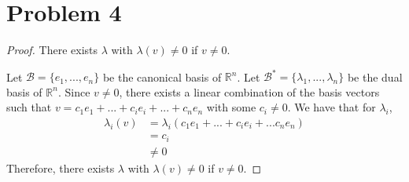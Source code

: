 \section*{Problem 4}
\begin{proof} There exists $\lambda$ with $\lambda(v) \neq 0$ if $v \neq 0$.\gap

    Let $\mathcal{B} = \{e_1,...,e_n\}$ be 
    the canonical basis of $\mathbb{R}^n$.
    Let $\mathcal{B}^* = \{\lambda_1,...,\lambda_n\}$ be 
    the dual basis of $\mathbb{R}^n$.
    Since $v \neq 0$, there exists a linear combination of the basis vectors 
    such that $v = c_1e_1 + ... + c_ie_i + ... + c_ne_n$ with some $c_i \neq 0$.
    We have that for $\lambda_i$,
    \begin{align*}
        \lambda_i(v)
        &= \lambda_i(c_1e_1 + ... + c_ie_i + ... c_ne_n)\\
        &= c_i\\
        &\neq 0
    \end{align*}
    Therefore, there exists $\lambda$ with $\lambda(v) \neq 0$ if $v \neq 0$.
\end{proof}